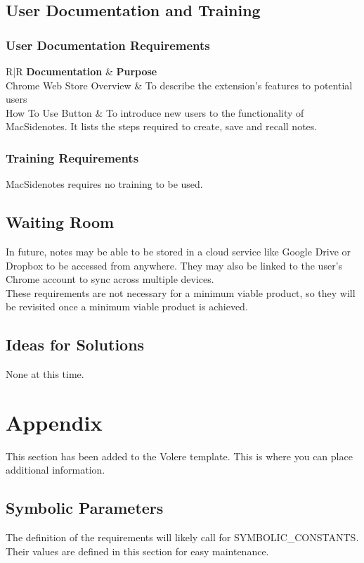 \documentclass[12pt, titlepage]{article}
\begin{document}
\subsection{User Documentation and Training}
\subsubsection{User Documentation Requirements}
	\begin{table}[H]
		\setlength{\extrarowheight}{1ex}
		\caption {\bf User Documentation Requirements}
		\begin{tabularx}{\textwidth}{R|R}
			{\bf Documentation} & {\bf Purpose} \\
			\hline
			Chrome Web Store Overview & To describe the extension's features to potential users \\
			How To Use Button & To introduce new users to the functionality of MacSidenotes. It lists the steps required to create, save and recall notes.\\
		\end{tabularx}
		
	\end{table}
\subsubsection{Training Requirements}
	MacSidenotes requires no training to be used.
	
\subsection{Waiting Room}
	In future, notes may be able to be stored in a cloud service like Google Drive or Dropbox to be accessed from anywhere. They may also be linked to the user's Chrome account to sync across multiple devices.\\
	These requirements are not necessary for a minimum viable product, so they will be revisited once a minimum viable product is achieved.
\subsection{Ideas for Solutions}
	None at this time.




\newpage

\section{Appendix}

This section has been added to the Volere template.  This is where you can place
additional information.

\subsection{Symbolic Parameters}

The definition of the requirements will likely call for SYMBOLIC\_CONSTANTS.
Their values are defined in this section for easy maintenance.
\end{document}
